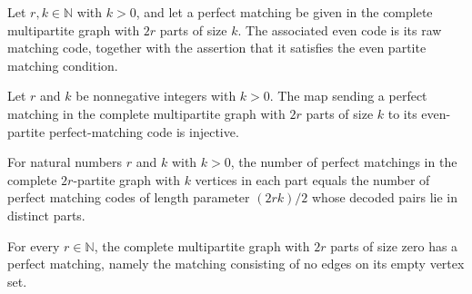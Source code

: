 \begin{definition}
\label{FABL.graphPartiteMatchingToEvenCode}
\leanok
{}
Let $r,k\in\mathbb{N}$ with $k>0$, and let a perfect matching be given in the complete
multipartite graph with $2r$ parts of size $k$. The associated even code is its raw
matching code, together with the assertion that it satisfies the even partite matching
condition.
\end{definition}

\begin{theorem}
\label{FABL.graphPartiteMatchingToEvenCode_injective}
\leanok
{}
Let $r$ and $k$ be nonnegative integers with $k>0$. The map sending a perfect matching
in the complete multipartite graph with $2r$ parts of size $k$ to its even-partite
perfect-matching code is injective.
\end{theorem}

\begin{theorem}
\label{FABL.card_graphPartitePerfectMatching_eq_partitePerfectMatching_of_pos}
\leanok
{}
For natural numbers $r$ and $k$ with $k>0$, the number of perfect matchings in the
complete $2r$-partite graph with $k$ vertices in each part equals the number of perfect
matching codes of length parameter $(2rk)/2$ whose decoded pairs lie in distinct parts.
\end{theorem}

\begin{definition}
\label{FABL.emptyGraphPartitePerfectMatching}
\leanok
{}
For every $r\in\mathbb{N}$, the complete multipartite graph with $2r$ parts of size zero
has a perfect matching, namely the matching consisting of no edges on its empty vertex
set.
\end{definition}

